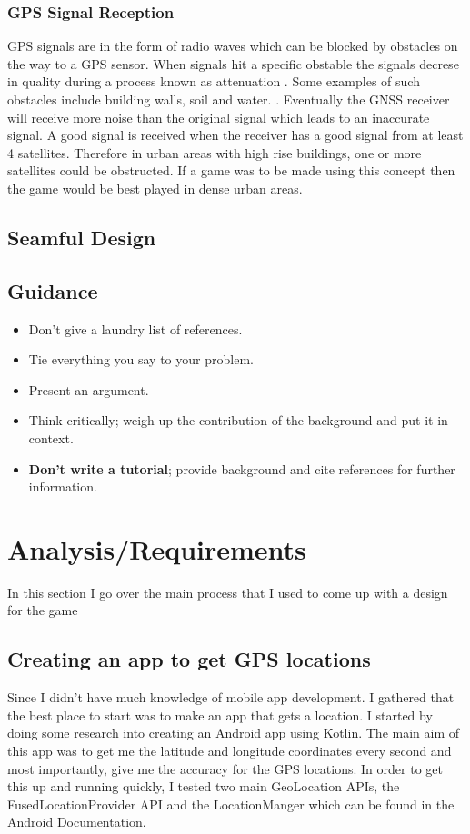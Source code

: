 \documentclass{l4proj}
\begin{document}
\subsection{GPS Signal Reception}
GPS signals are in the form of radio waves which can be blocked by obstacles on the way to a GPS sensor. When signals hit a specific obstable
the signals decrese in quality during a process known as attenuation \citep{Indoor2010}. Some examples of such obstacles include
building walls, soil and water. \citep{Kleusberg1990}. Eventually the GNSS receiver will receive more noise
than the original signal which leads to an inaccurate signal. A good signal is received when the receiver has a good signal from at least 4
satellites. Therefore in urban areas with high rise buildings, one or more satellites could be obstructed. If a game was to be made
using this concept then the game would be best played in dense urban areas.

\section{Seamful Design}


\section{Guidance}
\begin{itemize}    
    \item
      Don't give a laundry list of references.
    \item
      Tie everything you say to your problem.
    \item
      Present an argument.
    \item Think critically; weigh up the contribution of the background and put it in context.    
    \item
      \textbf{Don't write a tutorial}; provide background and cite
      references for further information.
\end{itemize}

\chapter{Analysis/Requirements}
In this section I go over the main process that I used to come up with a design for the game

\section{Creating an app to get GPS locations}
Since I didn't have much knowledge of mobile app development. I gathered that the best place to start was to make an app that gets a location. 
I started by doing some research into creating an Android app using Kotlin. The main aim of this app was to get me the latitude and longitude coordinates every second and most importantly, give me the accuracy for the GPS locations. 
In order to get this up and running quickly, I tested two main GeoLocation APIs, the FusedLocationProvider API and the LocationManger which can be found in the Android Documentation.
\end{document}
